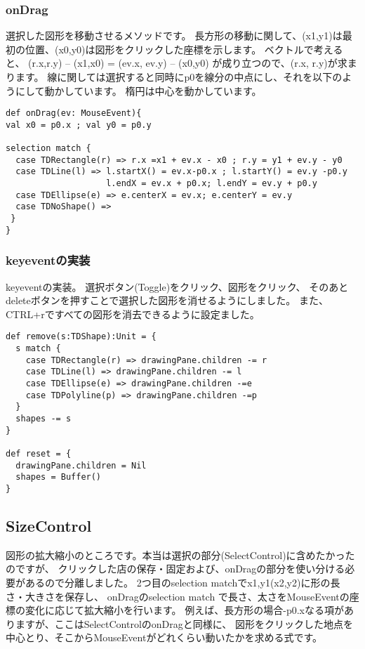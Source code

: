 \documentclass [11pt] {jsarticle}
\begin{document}
\subsubsection{onDrag}
選択した図形を移動させるメソッドです。
長方形の移動に関して、(x1,y1)は最初の位置、(x0,y0)は図形をクリックした座標を示します。
ベクトルで考えると、
(r.x,r.y) – (x1,x0) = (ev.x, ev.y) – (x0,y0) が成り立つので、(r.x, r.y)が求まります。
線に関しては選択すると同時にp0を線分の中点にし、それを以下のようにして動かしています。
楕円は中心を動かしています。

\begin{verbatim}
def onDrag(ev: MouseEvent){
val x0 = p0.x ; val y0 = p0.y

selection match {
  case TDRectangle(r) => r.x =x1 + ev.x - x0 ; r.y = y1 + ev.y - y0
  case TDLine(l) => l.startX() = ev.x-p0.x ; l.startY() = ev.y -p0.y
                    l.endX = ev.x + p0.x; l.endY = ev.y + p0.y
  case TDEllipse(e) => e.centerX = ev.x; e.centerY = ev.y
  case TDNoShape() =>
 }
}
\end{verbatim}

\subsubsection{keyeventの実装}
keyeventの実装。
選択ボタン(Toggle)をクリック、図形をクリック、
そのあとdeleteボタンを押すことで選択した図形を消せるようにしました。
また、CTRL+rですべての図形を消去できるように設定ました。

\begin{verbatim}
def remove(s:TDShape):Unit = {
  s match {
    case TDRectangle(r) => drawingPane.children -= r
    case TDLine(l) => drawingPane.children -= l
    case TDEllipse(e) => drawingPane.children -=e
    case TDPolyline(p) => drawingPane.children -=p
  }
  shapes -= s
}

def reset = {
  drawingPane.children = Nil
  shapes = Buffer()
}
\end{verbatim}

\subsection{SizeControl}
図形の拡大縮小のところです。本当は選択の部分(SelectControl)に含めたかったのですが、
クリックした店の保存・固定および、onDragの部分を使い分ける必要があるので分離しました。
2つ目のselection matchでx1,y1(x2,y2)に形の長さ・大きさを保存し、
onDragのselection match で長さ、太さをMouseEventの座標の変化に応じて拡大縮小を行います。
例えば、長方形の場合-p0.xなる項がありますが、ここはSelectControlのonDragと同様に、
図形をクリックした地点を中心とり、そこからMouseEventがどれくらい動いたかを求める式です。
\end{document}
